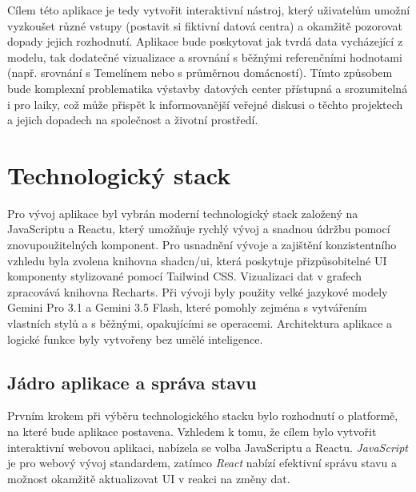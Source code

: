 Cílem této aplikace je tedy vytvořit interaktivní nástroj, který uživatelům umožní vyzkoušet různé vstupy (postavit si fiktivní datová centra) a okamžitě pozorovat dopady jejich rozhodnutí. Aplikace bude poskytovat jak tvrdá data vycházející z modelu, tak dodatečné vizualizace a srovnání s běžnými referenčními hodnotami (např. srovnání s Temelínem nebo s průměrnou domácností). Tímto způsobem bude komplexní problematika výstavby datových center přístupná a srozumitelná i pro laiky, což může přispět k informovanější veřejné diskusi o těchto projektech a jejich dopadech na společnost a životní prostředí.

\section{Technologický stack}
\label{sec:app_stack}


Pro vývoj aplikace byl vybrán moderní technologický stack založený na JavaScriptu a Reactu, který umožňuje rychlý vývoj a snadnou údržbu pomocí znovupoužitelných komponent. Pro usnadnění vývoje a zajištění konzistentního vzhledu byla zvolena knihovna shadcn/ui, která poskytuje přizpůsobitelné UI komponenty stylizované pomocí Tailwind CSS. Vizualizaci dat v grafech zpracovává knihovna Recharts. Při vývoji byly použity velké jazykové modely Gemini Pro 3.1 a Gemini 3.5 Flash, které pomohly zejména s vytvářením vlastních stylů a s běžnými, opakujícími se operacemi. Architektura aplikace a logické funkce byly vytvořeny bez umělé inteligence.

\subsection{Jádro aplikace a správa stavu}
\label{subsec:app_stack_jadro}

Prvním krokem při výběru technologického stacku bylo rozhodnutí o platformě, na které bude aplikace postavena. Vzhledem k tomu, že cílem bylo vytvořit interaktivní webovou aplikaci, nabízela se volba JavaScriptu a Reactu. \textit{JavaScript} je pro webový vývoj standardem, zatímco \textit{React} nabízí efektivní správu stavu a možnost okamžitě aktualizovat UI v reakci na změny dat.

